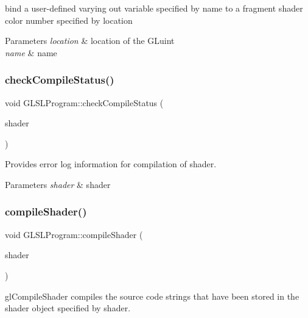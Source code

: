 bind a user-\/defined varying out variable specified by name to a fragment shader color number specified by location 


\begin{DoxyParams}{Parameters}
{\em location} & location of the G\+Luint \\
\hline
{\em name} & name \\
\hline
\end{DoxyParams}
\hypertarget{class_g_l_s_l_program_a4eebc77a6efe271bbf5eba25e8a27b66}{}\label{class_g_l_s_l_program_a4eebc77a6efe271bbf5eba25e8a27b66} 
\subsubsection{\texorpdfstring{check\+Compile\+Status()}{checkCompileStatus()}}
{\footnotesize\ttfamily void G\+L\+S\+L\+Program\+::check\+Compile\+Status (\begin{DoxyParamCaption}\item[{G\+Luint}]{shader }\end{DoxyParamCaption})}



Provides error log information for compilation of shader. 


\begin{DoxyParams}{Parameters}
{\em shader} & shader \\
\hline
\end{DoxyParams}
\hypertarget{class_g_l_s_l_program_ae1ebde6b1ea8269f37064adb8e6d857f}{}\label{class_g_l_s_l_program_ae1ebde6b1ea8269f37064adb8e6d857f} 
\subsubsection{\texorpdfstring{compile\+Shader()}{compileShader()}}
{\footnotesize\ttfamily void G\+L\+S\+L\+Program\+::compile\+Shader (\begin{DoxyParamCaption}\item[{G\+Luint}]{shader }\end{DoxyParamCaption})}



gl\+Compile\+Shader compiles the source code strings that have been stored in the shader object specified by shader. 



